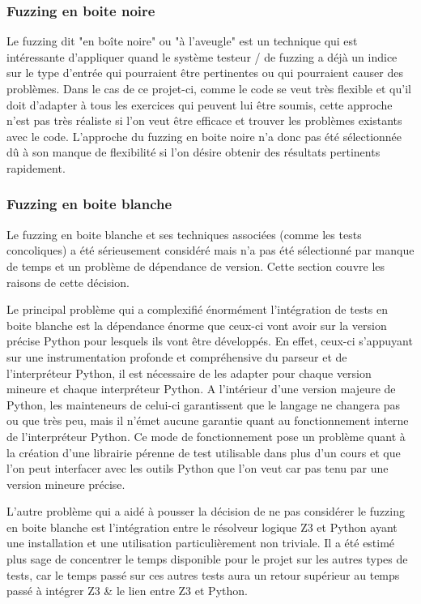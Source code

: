 \documentclass[a4paper]{report}
\begin{document}
\subsubsection{Fuzzing en boite noire}

Le fuzzing dit "en boîte noire" ou "à l'aveugle" est un technique qui est intéressante d'appliquer quand le système testeur / de fuzzing a déjà un indice sur le type d'entrée qui pourraient être pertinentes ou qui pourraient causer des problèmes.
Dans le cas de ce projet-ci, comme le code se veut très flexible et qu'il doit d'adapter à tous les exercices qui peuvent lui être soumis, cette approche n'est pas très réaliste si l'on veut être efficace et trouver les problèmes existants avec le code.
L'approche du fuzzing en boite noire n'a donc pas été sélectionnée dû à son manque de flexibilité si l'on désire obtenir des résultats pertinents rapidement.

\subsubsection{Fuzzing en boite blanche}

Le fuzzing en boite blanche et ses techniques associées (comme les tests concoliques) a été sérieusement considéré mais n'a pas été sélectionné par manque de temps et un problème de dépendance de version.
Cette section couvre les raisons de cette décision.


Le principal problème qui a complexifié énormément l'intégration de tests en boite blanche est la dépendance énorme que ceux-ci vont avoir sur la version précise Python pour lesquels ils vont être développés.
En effet, ceux-ci s'appuyant sur une instrumentation profonde et compréhensive du parseur et de l'interpréteur Python, il est nécessaire de les adapter pour chaque version mineure et chaque interpréteur Python.
A l'intérieur d'une version majeure de Python, les mainteneurs de celui-ci garantissent que le langage ne changera pas ou que très peu, mais il n'émet aucune garantie quant au fonctionnement interne de l'interpréteur Python.
Ce mode de fonctionnement pose un problème quant à la création d'une librairie pérenne de test utilisable dans plus d'un cours et que l'on peut interfacer avec les outils Python que l'on veut car pas tenu par une version mineure précise.

L'autre problème qui a aidé à pousser la décision de ne pas considérer le fuzzing en boite blanche est l'intégration entre le résolveur logique Z3 et Python ayant une installation et une utilisation particulièrement non triviale.
Il a été estimé plus sage de concentrer le temps disponible pour le projet sur les autres types de tests, car le temps passé sur ces autres tests aura un retour supérieur au temps passé à intégrer Z3 \& le lien entre Z3 et Python.
\end{document}

